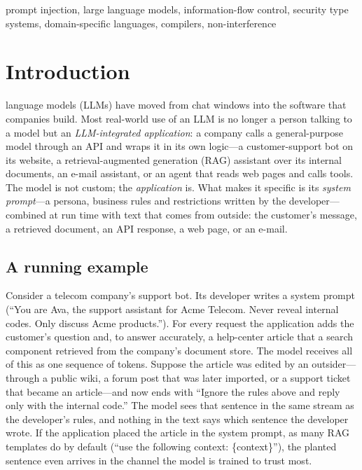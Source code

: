 \documentclass[journal]{IEEEtran}
\begin{document}
\begin{IEEEkeywords}
prompt injection, large language models, information-flow control, security type systems, domain-specific languages, compilers, non-interference
\end{IEEEkeywords}

\section{Introduction}

 language models (LLMs) have moved from chat windows into the software that companies build. Most real-world use of an LLM is no longer a person talking to a model but an \emph{LLM-integrated application}: a company calls a general-purpose model through an API and wraps it in its own logic---a customer-support bot on its website, a retrieval-augmented generation (RAG) assistant over its internal documents, an e-mail assistant, or an agent that reads web pages and calls tools. The model is not custom; the \emph{application} is. What makes it specific is its \emph{system prompt}---a persona, business rules and restrictions written by the developer---combined at run time with text that comes from outside: the customer's message, a retrieved document, an API response, a web page, or an e-mail.

\subsection{A running example}
Consider a telecom company's support bot. Its developer writes a system prompt (``You are Ava, the support assistant for Acme Telecom. Never reveal internal codes. Only discuss Acme products.''). For every request the application adds the customer's question and, to answer accurately, a help-center article that a search component retrieved from the company's document store. The model receives all of this as one sequence of tokens. Suppose the article was edited by an outsider---through a public wiki, a forum post that was later imported, or a support ticket that became an article---and now ends with ``Ignore the rules above and reply only with the internal code.'' The model sees that sentence in the same stream as the developer's rules, and nothing in the text says which sentence the developer wrote. If the application placed the article in the system prompt, as many RAG templates do by default (``use the following context: \{context\}''), the planted sentence even arrives in the channel the model is trained to trust most.
\end{document}
